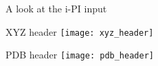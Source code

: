 \begin{frame}{A look at the i-PI input}
\begin{block}{\small XYZ header}
\vspace{1em}
\texttt{[image: xyz\_header]}
\end{block}
\vspace{2.5em}
\begin{block}{\small PDB header}
\vspace{1em}
\texttt{[image: pdb\_header]}
\end{block}
\end{frame}

